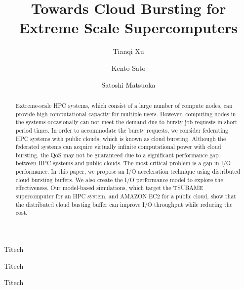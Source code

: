 \documentclass[JIP]{ipsj}
\begin{document}
\title{Towards Cloud Bursting for Extreme Scale Supercomputers}

\author{Tianqi Xu}{Titech}
\author{Kento Sato}{Titech}
\author{Satoshi Matsuoka}{Titech}

\begin{abstract}


Extreme-scale HPC systems, which consist of a large number of compute nodes, can provide high computational capacity for multiple users. However, computing nodes in the systems occasionally can not meet the demand due to bursty job requests in short period times. In order to accommodate the bursty requests, we consider federating HPC systems with public clouds, which is known as cloud bursting. Although the federated systems can acquire virtually infinite computational power with cloud bursting, the QoS may not be guaranteed due to a significant performance gap between HPC systems and public clouds. The most critical problem is a gap in I/O performance. In this paper, we propose an I/O acceleration technique using distributed cloud bursting buffers. We also create the I/O performance model to explore the effectiveness. Our model-based simulations, which target the TSUBAME supercomputer for an HPC system, and AMAZON EC2 for a public cloud, show that the distributed cloud busting buffer can improve I/O throughput while reducing the cost.

\end{abstract}
\end{document}
